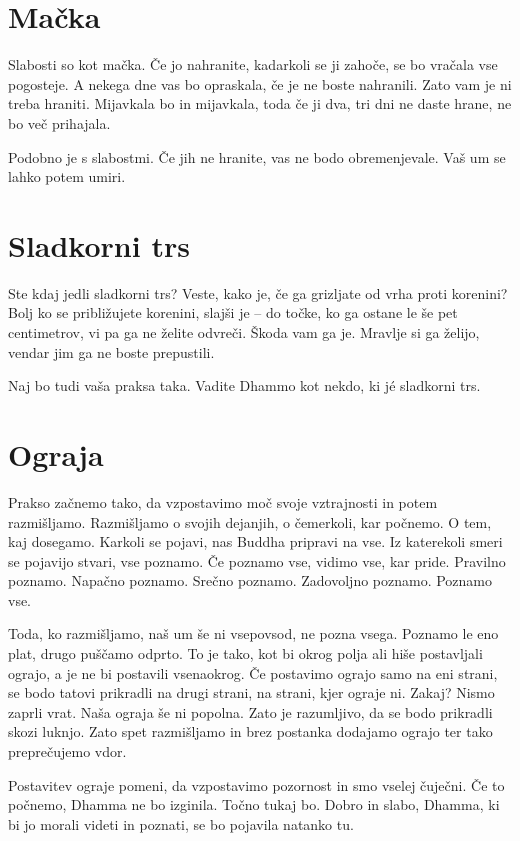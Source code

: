 \section{Mačka}

Slabosti so kot mačka. Če jo nahranite, kadarkoli se ji zahoče, se bo vračala vse pogosteje. A nekega dne vas bo opraskala, če je ne boste nahranili. Zato vam je ni treba hraniti. Mijavkala bo in mijavkala, toda če ji dva, tri dni ne daste hrane, ne bo več prihajala.

Podobno je s slabostmi. Če jih ne hranite, vas ne bodo obremenjevale. Vaš um se lahko potem umiri.

\section{Sladkorni trs}

Ste kdaj jedli sladkorni trs? Veste, kako je, če ga grizljate od vrha proti korenini? Bolj ko se približujete korenini, slajši je – do točke, ko ga ostane le še pet centimetrov, vi pa ga ne želite odvreči. Škoda vam ga je. Mravlje si ga želijo, vendar jim ga ne boste prepustili.

Naj bo tudi vaša praksa taka. Vadite Dhammo kot nekdo, ki jé sladkorni trs.

\section{Ograja}

Prakso začnemo tako, da vzpostavimo moč svoje vztrajnosti in potem razmišljamo. Razmišljamo o svojih dejanjih, o čemerkoli, kar počnemo. O tem, kaj dosegamo. Karkoli se pojavi, nas Buddha pripravi na vse. Iz katerekoli smeri se pojavijo stvari, vse poznamo. Če poznamo vse, vidimo vse, kar pride. Pravilno poznamo. Napačno poznamo. Srečno poznamo. Zadovoljno poznamo. Poznamo vse.

Toda, ko razmišljamo, naš um še ni vsepovsod, ne pozna vsega. Poznamo le eno plat, drugo puščamo odprto. To je tako, kot bi okrog polja ali hiše postavljali ograjo, a je ne bi postavili vsenaokrog. Če postavimo ograjo samo na eni strani, se bodo tatovi prikradli na drugi strani, na strani, kjer ograje ni. Zakaj? Nismo zaprli vrat. Naša ograja še ni popolna. Zato je razumljivo, da se bodo prikradli skozi luknjo. Zato spet razmišljamo in brez postanka dodajamo ograjo ter tako preprečujemo vdor.

Postavitev ograje pomeni, da vzpostavimo pozornost in smo vselej čuječni. Če to počnemo, Dhamma ne bo izginila. Točno tukaj bo. Dobro in slabo, Dhamma, ki bi jo morali videti in poznati, se bo pojavila natanko tu.

